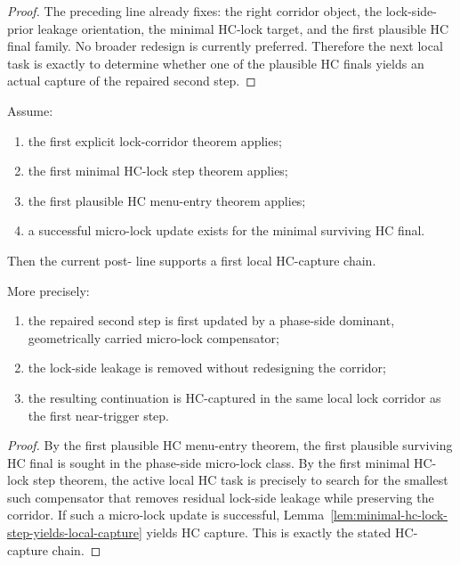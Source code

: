 \begin{proof}
The preceding line already fixes: the right corridor object, the lock-side-prior leakage orientation, the minimal HC-lock target, and the first plausible HC final family. No broader redesign is currently preferred. Therefore the next local task is exactly to determine whether one of the plausible HC finals yields an actual capture of the repaired second step.
\end{proof}

\begin{theorem}
\label{thm:first-local-hc-capture-chain-theorem}
Assume:
\begin{enumerate}[leftmargin=2em,label=(\alph*)]
 \item the first explicit lock-corridor theorem applies;
 \item the first minimal HC-lock step theorem applies;
 \item the first plausible HC menu-entry theorem applies;
 \item a successful micro-lock update exists for the minimal surviving HC final.
\end{enumerate}
Then the current post- line supports a first local HC-capture chain.

More precisely:
\begin{enumerate}[leftmargin=2em,label=(\roman*)]
 \item the repaired second step is first updated by a phase-side dominant, geometrically carried micro-lock compensator;
 \item the lock-side leakage is removed without redesigning the corridor;
 \item the resulting continuation is HC-captured in the same local lock corridor as the first near-trigger step.
\end{enumerate}
\end{theorem}

\begin{proof}
By the first plausible HC menu-entry theorem, the first plausible surviving HC final is sought in the phase-side micro-lock class. By the first minimal HC-lock step theorem, the active local HC task is precisely to search for the smallest such compensator that removes residual lock-side leakage while preserving the corridor. If such a micro-lock update is successful, Lemma~\ref{lem:minimal-hc-lock-step-yields-local-capture} yields HC capture. This is exactly the stated HC-capture chain.
\end{proof}

